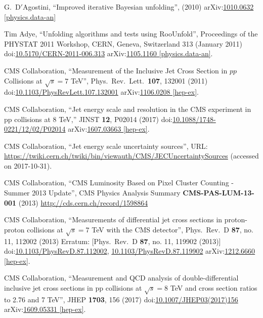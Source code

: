 \begin{thebibliography}{99}
G.~D$'$Agostini, ``Improved iterative Bayesian unfolding'', (2010) arXiv:\href{https://arxiv.org/abs/1010.0632}{1010.0632 [physics.data-an]}

Tim Adye, ``Unfolding algorithms and tests using RooUnfold'', Proceedings of the PHYSTAT 2011 Workshop, CERN, Geneva, Switzerland 313 (January 2011) doi:\href{http://dx.doi.org/10.5170/CERN-2011-006.313}{10.5170/CERN-2011-006.313} arXiv:\href{https://arxiv.org/abs/1105.1160}{1105.1160 [physics.data-an]}.

CMS Collaboration, ``Measurement of the Inclusive Jet Cross Section in $pp$ Collisions at $\sqrt{s}=7$ TeV'', Phys.\ Rev.\ Lett.\ {\bf 107}, 132001 (2011) doi:\href{https://doi.org/10.1103/PhysRevLett.107.132001}{10.1103/PhysRevLett.107.132001} arXiv:\href{https://arxiv.org/abs/1106.0208}{1106.0208 [hep-ex]}.

CMS Collaboration, ``Jet energy scale and resolution in the CMS experiment in pp collisions at 8 TeV,'' JINST {\bf 12}, P02014 (2017) doi:\href{http://dx.doi.org/10.1088/1748-0221/12/02/P02014}{10.1088/1748-0221/12/02/P02014} arXiv:\href{https://arxiv.org/abs/1607.03663}{1607.03663 [hep-ex]}.

CMS Collaboration, ``Jet energy scale uncertainty sources'', URL: \url{https://twiki.cern.ch/twiki/bin/viewauth/CMS/JECUncertaintySources} (accessed on 2017-10-31).

CMS Collaboration, ``CMS Luminosity Based on Pixel Cluster Counting - Summer 2013 Update'', CMS Physics Analysis Summary {\bf CMS-PAS-LUM-13-001} (2013) \url{http://cds.cern.ch/record/1598864}

CMS Collaboration, ``Measurements of differential jet cross sections in proton-proton collisions at $\sqrt{s}=7$ TeV with the CMS detector'',  Phys.\ Rev.\ D {\bf 87}, no. 11, 112002 (2013) Erratum: [Phys.\ Rev.\ D {\bf 87}, no. 11, 119902 (2013)] doi:\href{http://dx.doi.org/10.1103/PhysRevD.87.112002}{10.1103/PhysRevD.87.112002}, \href{http://dx.doi.org/10.1103/PhysRevD.87.119902}{10.1103/PhysRevD.87.119902} arXiv:\href{https://arxiv.org/abs/1212.6660}{1212.6660 [hep-ex]}.

CMS Collaboration, ``Measurement and QCD analysis of double-differential inclusive jet cross sections in pp collisions at $ \sqrt{s}=8 $ TeV and cross section ratios to 2.76 and 7 TeV'', JHEP {\bf 1703}, 156 (2017) doi:\href{http://dx.doi.org/10.1007/JHEP03(2017)156}{10.1007/JHEP03(2017)156} arXiv:\href{https://arxiv.org/abs/1609.05331}{1609.05331 [hep-ex]}.


\end{thebibliography}
